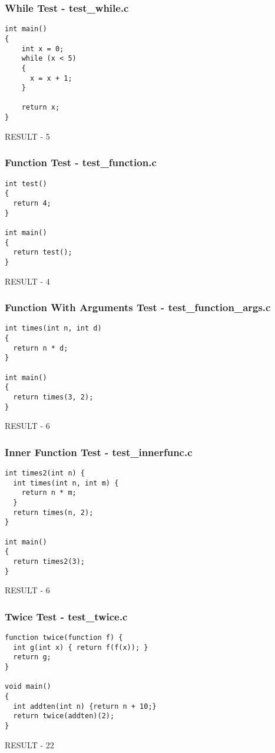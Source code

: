 \documentclass{article}
\begin{document}
\subsubsection{While Test - test\_while.c}
\begin{lstlisting}
int main()
{
    int x = 0;
    while (x < 5)
    {
      x = x + 1;
    }

    return x;
}
\end{lstlisting}
RESULT - 5

\subsubsection{Function Test - test\_function.c}
\begin{lstlisting}
int test()
{
  return 4;
}

int main()
{
  return test();
}
\end{lstlisting}
RESULT - 4

\subsubsection{Function With Arguments Test - test\_function\_args.c}
\begin{lstlisting}
int times(int n, int d)
{
  return n * d;
}

int main()
{
  return times(3, 2);
}
\end{lstlisting}
RESULT - 6

\subsubsection{Inner Function Test - test\_innerfunc.c}
\begin{lstlisting}
int times2(int n) {
  int times(int n, int m) {
    return n * m;
  }
  return times(n, 2);
}

int main()
{
  return times2(3);
}
\end{lstlisting}
RESULT - 6

\subsubsection{Twice Test - test\_twice.c}
\begin{lstlisting}
function twice(function f) {
  int g(int x) { return f(f(x)); }
  return g;
}

void main()
{
  int addten(int n) {return n + 10;}
  return twice(addten)(2);
}
\end{lstlisting}
RESULT - 22
\end{document}
